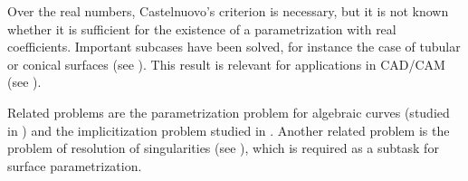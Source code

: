 Over the real numbers, Castelnuovo's criterion is necessary,
but it is not known whether it is sufficient
for the existence of a parametrization with real coefficients.
Important subcases have been solved, for instance the case
of tubular or conical surfaces (see \cite{Schicho:98c,Peternell:97}).
This result is relevant for applications in CAD/CAM
(see \cite{Arrondro_Sendra_Sendra:97,Pottmann:97}).

Related problems are the parametrization problem for algebraic
curves (studied in
\cite{Walker:78,Abhyankar_Bajaj:87,Sendra_Winkler:91,Schicho:92,%
Hoeij:94,Mnuk_Sendra_Winkler:96,Mnuk:96,Sendra_Winkler:97,Hoeij:97})
and the implicitization problem
studied in \cite{Canny_Manocha:92,Gao_Chou:92,Kalkbrener:90c,Choinh_Goldman:92}.
Another related problem is the problem of resolution of singularities
(see \cite{Walker:35,Hironaka:64,Lipman:78,Villamayor:89,Bierstone_Milman:91,%
Bodnar_Schicho:98,Schicho_u:99c}),
which is required as a subtask for surface parametrization.



